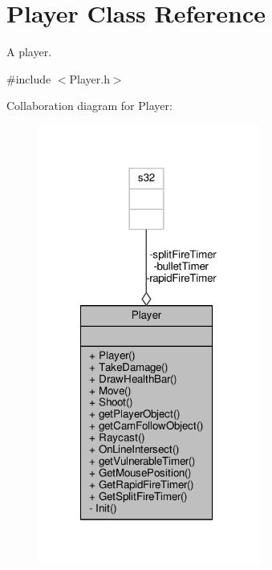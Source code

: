 \hypertarget{class_player}{\section{Player Class Reference}
\label{class_player}
}


A player.  




{\ttfamily \#include $<$Player.\-h$>$}



Collaboration diagram for Player\-:
\nopagebreak
\begin{figure}[H]
\begin{center}
\leavevmode
\includegraphics[width=207pt]{class_player__coll__graph}
\end{center}
\end{figure}
